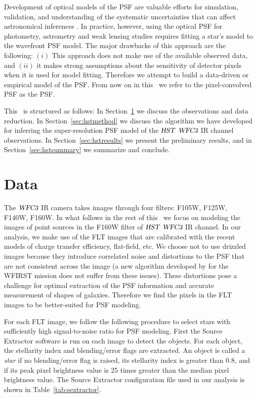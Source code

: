 Development of optical models of the PSF are valuable efforts for simulation, validation, and understanding of the systematic uncertainties 
that can affect astronomical inferences \citep{great3,galsim}. In practice, however, using the optical PSF for photometry, astrometry and weak lensing studies 
requires fitting a star's model to the wavefront PSF model. The major drawbacks of this approach are the following: $(i)$ This approach does not make use of the available observed 
data, and $(ii)$ it makes strong assumptions about the sensitivity of detector pixels when it is used for model fitting. Therefore we attempt to build a 
data-driven or empirical model of the PSF. From now on in this \paper\, we refer to the pixel-convolved PSF as the PSF. 

This \paper\ is structured as follows: In Section~\ref{sec:hstdata} we discuss the observations and data reduction. In Section~\ref{sec:hstmethod} we discuss the algorithm we 
have developed for inferring the super-resolution PSF model of the ${\textsl{HST}}$ ${\textsl{WFC3}}$ IR channel observations. In Section~\ref{sec:hstresults} we present the preliminary results, and %
in Section~\ref{sec:hstsummary} we summarize and conclude. 

\section{Data}\label{sec:hstdata}

The ${\textsl{WFC3}}$ IR camera takes images through four filters: F105W, F125W, F140W, F160W.
In what follows in the rest of this \paper\ we focus on modeling the images of point sources in the F160W filter of ${\textsl{HST}}$ ${\textsl{WFC3}}$ IR channel. 
In our analysis, we make use of the FLT images that are calibrated with the recent models of charge transfer efficiency, flat-field, etc. 
We choose not to use drizzled images \citep{drizzle,astrodrizzle} because they introduce correlated noise and 
distortions to the PSF that are not consistent across the image (a new algorithm developed by \citealt{olic} for the WFIRST mission does not suffer from these issues). 
These distortions pose a challenge for optimal extraction of the PSF information and accurate measurement of shapes of galaxies. Therefore we find the pixels in the FLT images to be better-suited for PSF modeling. 

For each FLT image, we follow the following procedure to select stars with sufficiently high signal-to-noise ratio 
for PSF modeling. First the Source Extractor software \citep{sextractor} is run on each image to detect the objects. 
For each object, the stellarity index and blending/error flags are extracted. An object is called a \emph{star} if no blending/error flag is 
raised, its stellarity index is greater than 0.8, and if its peak pixel brightness value is 25 times greater than the median pixel brightness 
value. The Source Extractor configuration file used in our analysis is shown in Table~\ref{tab:sextractor}. 

